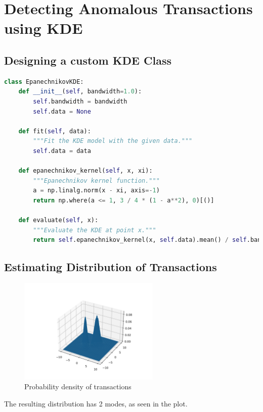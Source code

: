 \section{Detecting Anomalous Transactions using KDE}
\subsection{Designing a custom KDE Class}
\begin{lstlisting}[language=Python, caption={Python code to implement \texttt{EpanechnikovKDE} class}, label=lst:epanechnikovkde]
class EpanechnikovKDE:
    def __init__(self, bandwidth=1.0):
        self.bandwidth = bandwidth
        self.data = None

    def fit(self, data):
        """Fit the KDE model with the given data."""
        self.data = data

    def epanechnikov_kernel(self, x, xi):
        """Epanechnikov kernel function."""
        a = np.linalg.norm(x - xi, axis=-1)
        return np.where(a <= 1, 3 / 4 * (1 - a**2), 0)[()]

    def evaluate(self, x):
        """Evaluate the KDE at point x."""
        return self.epanechnikov_kernel(x, self.data).mean() / self.bandwidth
\end{lstlisting}

\subsection{Estimating Distribution of Transactions}
\vspace{-20pt}
\begin{figure}[H]
	\centering
	\includegraphics[width=0.6\textwidth]{images/transaction_distribution.png}
	\caption{Probability density of transactions}
\end{figure}
The resulting distribution has 2 modes, as seen in the plot.
